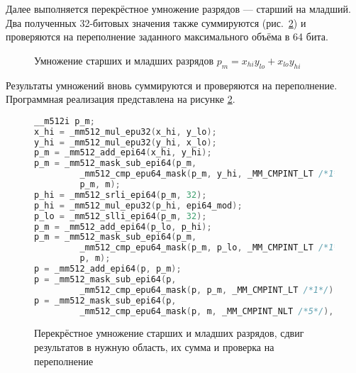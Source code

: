 Далее выполняется перекрёстное умножение разрядов --- старший на младший.
Два полученных 32-битовых значения также суммируются (рис.~\ref{fig: vector cross-lane multiplication}) и проверяются на переполнение заданного максимального объёма в 64 бита.
\begin{figure}
\centering
{}
\caption{Умножение старших и младших разрядов $p_m = x_{hi} y_{lo} + x_{lo} y_{hi}$}
\label{fig: vector horizontal operation example}
\end{figure}
Результаты умножений вновь суммируются и проверяются на переполнение.
Программная реализация представлена на рисунке \ref{fig: vector cross-lane multiplication}.
\begin{figure}
\centering
\begin{lstlisting}[language=C]
__m512i p_m;
x_hi = _mm512_mul_epu32(x_hi, y_lo);
y_hi = _mm512_mul_epu32(y_hi, x_lo);
p_m = _mm512_add_epi64(x_hi, y_hi);
p_m = _mm512_mask_sub_epi64(p_m,
         _mm512_cmp_epu64_mask(p_m, y_hi, _MM_CMPINT_LT /*1*/),
         p_m, m);
p_hi = _mm512_srli_epi64(p_m, 32);
p_hi = _mm512_mul_epu32(p_hi, epi64_mod);
p_lo = _mm512_slli_epi64(p_m, 32);
p_m = _mm512_add_epi64(p_lo, p_hi);
p_m = _mm512_mask_sub_epi64(p_m,
         _mm512_cmp_epu64_mask(p_m, p_lo, _MM_CMPINT_LT /*1*/),
         p, m);
p = _mm512_add_epi64(p, p_m);
p = _mm512_mask_sub_epi64(p,
         _mm512_cmp_epu64_mask(p, p_m, _MM_CMPINT_LT /*1*/), p, m);
p = _mm512_mask_sub_epi64(p,
         _mm512_cmp_epu64_mask(p, m, _MM_CMPINT_NLT /*5*/), p, m);
\end{lstlisting}
\caption{Перекрёстное умножение старших и младших разрядов, сдвиг результатов в нужную область, их сумма и проверка на переполнение}
\label{fig: vector cross-lane multiplication}
\end{figure}

